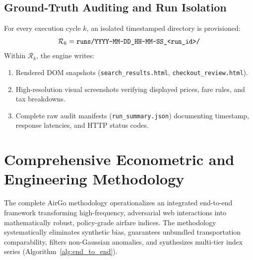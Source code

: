 \documentclass[11pt,a4paper]{article}
\begin{document}
\subsection{Ground-Truth Auditing and Run Isolation}
For every execution cycle $k$, an isolated timestamped directory is provisioned:
\begin{equation}
\mathcal{R}_k = \text{\texttt{runs/YYYY-MM-DD\_HH-MM-SS\_<run\_id>/}}
\end{equation}
Within $\mathcal{R}_k$, the engine writes:
\begin{enumerate}
    \item Rendered DOM snapshots (\texttt{search\_results.html}, \texttt{checkout\_review.html}).
    \item High-resolution visual screenshots verifying displayed prices, fare rules, and tax breakdowns.
    \item Complete raw audit manifests (\texttt{run\_summary.json}) documenting timestamp, response latencies, and HTTP status codes.
\end{enumerate}

\section{Comprehensive Econometric and Engineering Methodology}
\label{sec:methodology}

The complete AirGo methodology operationalizes an integrated end-to-end framework transforming high-frequency, adversarial web interactions into mathematically robust, policy-grade airfare indices. The methodology systematically eliminates synthetic bias, guarantees unbundled transportation comparability, filters non-Gaussian anomalies, and synthesizes multi-tier index series (Algorithm~\ref{alg:end_to_end}).
\end{document}
